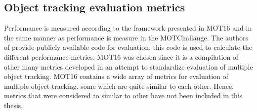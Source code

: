 \subsection{Object tracking evaluation metrics}
Performance is measured according to the framework presented in MOT16 \cite{DBLP:journals/corr/MilanL0RS16} and in the same manner as performance is measure in the MOTChallange. The authors of \cite{DBLP:journals/corr/MilanL0RS16} provide publicly available code for evaluation, this code is used to calculate the different performance metrics. MOT16 was chosen since it is a compilation of other many metrics developed in an attempt to standardize evaluation of multiple object tracking. MOT16 contains a wide array of metrics for evaluation of multiple object tracking, some which are quite similar to each other. Hence, metrics that were considered to similar to other have not been included in this thesis.

